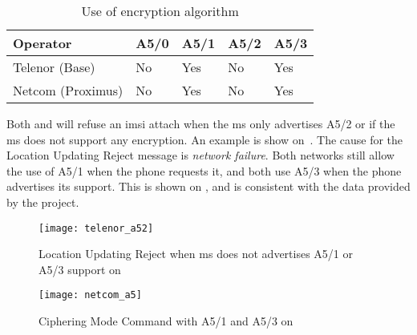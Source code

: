       \begin{table}[h]
        \centering
        \begin{tabular}{@{}lllll@{}}
          \toprule
          Operator          & A5/0  & A5/1 & A5/2 & A5/3 \\
          \midrule
          Telenor (Base)    & No    & Yes & No    & Yes  \\
          Netcom (Proximus) & No    & Yes & No    & Yes  \\
          \bottomrule
        \end{tabular}
        \caption{Use of encryption algorithm}
        \label{tab:plaintext}
      \end{table}

      Both  and  will refuse an \gls{imsi}
      attach when the \gls{ms} only advertises A5/2 or if the \gls{ms}
      does not support any encryption. An example is show
      on~. The cause for the Location Updating
      Reject message is \emph{network failure}. Both networks still
      allow the use of A5/1 when the phone requests it, and both use
      A5/3 when the phone advertises its support. This is shown on
      , and is consistent with the data provided by
      the  project.

      \begin{figure}[p]
        \centering
        \texttt{[image: telenor\_a52]}
        \caption{Location Updating Reject when \gls{ms} does not
        advertises A5/1 or A5/3 support on }
        \label{fig:telenor_a52}
      \end{figure}

      \begin{figure}[p]
        \centering
        \texttt{[image: netcom\_a5]}
        \caption{Ciphering Mode Command with A5/1 and A5/3 on }
        \label{fig:netcom_a5}
      \end{figure}

      \iffalse
      \begin{figure}
        \centering
        \texttt{[image: netcom\_a53]}
        \caption{Ciphering Mode Command with A5/3 on \comp{Netcom}}
        \label{fig:netcom_a53}
      \end{figure}
      \fi

      \iffalse
      While \comp{Netcom} asks the \gls{ms} for its capabilities on
      every \gls{imsi} attach, it is not the case for \comp{Telenor}.
      Therefore, it might take a while for a phone suddenly advertising
      A5/3 support instead of A5/1 to benefit from the stronger
      encryption, since the network is not aware of the change.
      \fi

